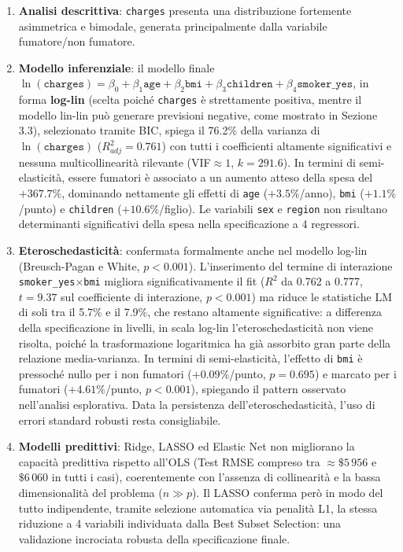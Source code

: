 \documentclass[11pt,a4paper]{article}
\begin{document}
\begin{enumerate}[nosep]
    \item \textbf{Analisi descrittiva}: \texttt{charges} presenta una
    distribuzione fortemente asimmetrica e bimodale, generata
    principalmente dalla variabile fumatore/non fumatore.
    \item \textbf{Modello inferenziale}: il modello finale
    $\ln(\texttt{charges}) = \beta_0+\beta_1\texttt{age}+\beta_2\texttt{bmi}+\beta_3\texttt{children}+\beta_4\texttt{smoker\_yes}$,
    in forma \textbf{log-lin} (scelta poiché \texttt{charges} è
    strettamente positiva, mentre il modello lin-lin può generare
    previsioni negative, come mostrato in Sezione 3.3), selezionato
    tramite BIC, spiega il 76.2\% della varianza di $\ln(\texttt{charges})$
    ($R^2_{adj}=0.761$) con tutti i coefficienti altamente significativi e
    nessuna multicollinearità rilevante (VIF$\approx1$, $k=291.6$). In
    termini di semi-elasticità, essere fumatori è associato a un aumento
    atteso della spesa del $+367.7\%$, dominando nettamente gli effetti di
    \texttt{age} ($+3.5\%$/anno), \texttt{bmi} ($+1.1\%$/punto) e
    \texttt{children} ($+10.6\%$/figlio). Le variabili \texttt{sex} e
    \texttt{region} non risultano determinanti significativi della spesa
    nella specificazione a 4 regressori.
    \item \textbf{Eteroschedasticità}: confermata formalmente anche nel
    modello log-lin (Breusch-Pagan e White, $p<0.001$). L'inserimento del
    termine di interazione \texttt{smoker\_yes}$\times$\texttt{bmi}
    migliora significativamente il fit ($R^2$ da 0.762 a 0.777, $t=9.37$
    sul coefficiente di interazione, $p<0.001$) ma riduce le statistiche
    LM di soli tra il 5.7\% e il 7.9\%, che restano altamente significative: a
    differenza della specificazione in livelli, in scala log-lin
    l'eteroschedasticità non viene risolta, poiché la trasformazione
    logaritmica ha già assorbito gran parte della relazione
    media-varianza. In termini di semi-elasticità, l'effetto di
    \texttt{bmi} è pressoché nullo per i non fumatori ($+0.09\%$/punto,
    $p=0.695$) e marcato per i fumatori ($+4.61\%$/punto, $p<0.001$),
    spiegando il pattern osservato nell'analisi esplorativa. Data la
    persistenza dell'eteroschedasticità, l'uso di errori standard robusti
    resta consigliabile.
    \item \textbf{Modelli predittivi}: Ridge, LASSO ed Elastic Net non
    migliorano la capacità predittiva rispetto all'OLS (Test RMSE
    compreso tra $\approx\$5\,956$ e $\$6\,060$ in tutti i casi), coerentemente con
    l'assenza di collinearità e la bassa dimensionalità del problema
    ($n\gg p$). Il LASSO conferma però in modo del tutto indipendente,
    tramite selezione automatica via penalità L1, la stessa riduzione a 4
    variabili individuata dalla Best Subset Selection: una validazione
    incrociata robusta della specificazione finale.
\end{enumerate}
\end{document}
